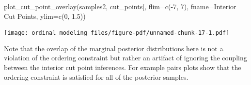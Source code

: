 \documentclass[
  letterpaper,
  DIV=11,
  numbers=noendperiod]{scrartcl}
\newenvironment{Shaded}{\begin{snugshade}}{\end{snugshade}}
\newcommand{\AttributeTok}[1]{\textcolor[rgb]{0.40,0.45,0.13}{#1}}
\newcommand{\DecValTok}[1]{\textcolor[rgb]{0.68,0.00,0.00}{#1}}
\newcommand{\FloatTok}[1]{\textcolor[rgb]{0.68,0.00,0.00}{#1}}
\newcommand{\FunctionTok}[1]{\textcolor[rgb]{0.28,0.35,0.67}{#1}}
\newcommand{\NormalTok}[1]{\textcolor[rgb]{0.00,0.23,0.31}{#1}}
\newcommand{\SpecialCharTok}[1]{\textcolor[rgb]{0.37,0.37,0.37}{#1}}
\newcommand{\StringTok}[1]{\textcolor[rgb]{0.13,0.47,0.30}{#1}}
\begin{document}
\begin{Shaded}
\begin{Highlighting}[]
\FunctionTok{plot\_cut\_point\_overlay}\NormalTok{(samples2, }\StringTok{\textquotesingle{}cut\_points[\textquotesingle{}}\NormalTok{,}
                       \AttributeTok{flim=}\FunctionTok{c}\NormalTok{(}\SpecialCharTok{{-}}\DecValTok{7}\NormalTok{, }\DecValTok{7}\NormalTok{), }\AttributeTok{fname=}\StringTok{\textquotesingle{}Interior Cut Points\textquotesingle{}}\NormalTok{,}
                       \AttributeTok{ylim=}\FunctionTok{c}\NormalTok{(}\DecValTok{0}\NormalTok{, }\FloatTok{1.5}\NormalTok{))}
\end{Highlighting}
\end{Shaded}

\texttt{[image: ordinal\_modeling\_files/figure-pdf/unnamed-chunk-17-1.pdf]}

Note that the overlap of the marginal posterior distributions here is
not a violation of the ordering constraint but rather an artifact of
ignoring the coupling between the interior cut point inferences. For
example pairs plots show that the ordering constraint is satisfied for
all of the posterior samples.

\begin{Shaded}
\end{Shaded}
\end{document}
